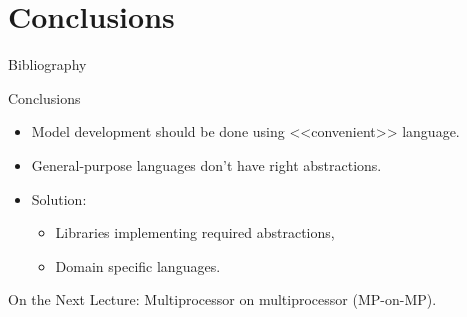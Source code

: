 
\section*{Conclusions}

\begin{frame}[allowframebreaks]{Bibliography}
  \nocite{Hadjiyiannis-ISDL}
  \nocite{Schliebusch-LISA}
  \nocite{Nikhil-BSV}
  \printbibliography
\end{frame}

\begin{frame}{Conclusions}
  \begin{itemize}
    \item Model development should be done using <<convenient>> language.
    \item General-purpose languages don't have right abstractions.
    \item Solution:
    \begin{itemize}
      \item Libraries implementing required abstractions,
      \item Domain specific languages.
    \end{itemize}
  \end{itemize}
\end{frame}

\begin{frame}{On the Next Lecture:}
  Multiprocessor on multiprocessor (MP-on-MP).
\end{frame}

\finalslide


